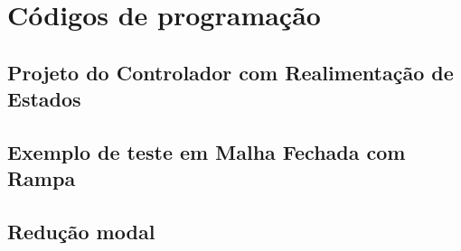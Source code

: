 \chapter{Códigos de programação}\label{apd:cdg}

\section{Projeto do Controlador com Realimentação de Estados}


\section{Exemplo de teste em Malha Fechada com Rampa}


\section{Redução modal}
